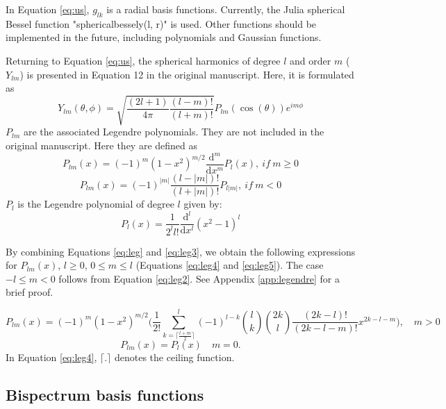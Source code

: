 \documentclass[12pt]{article}
\begin{document}
In Equation \ref{eq:us}, $g_{lk}$ is a radial basis functions. Currently, the Julia spherical Bessel function "sphericalbessely(l, r)" is used. Other functions should be implemented in the future, including polynomials and Gaussian functions.

Returning to Equation \ref{eq:us}, the spherical harmonics of degree $l$ and order $m$ ($Y_{lm}$) is presented in Equation 12 in the original manuscript. Here, it is formulated as
\begin{equation}
 Y_{lm}(\theta,\phi) = \sqrt{\frac{(2l + 1)}{4 \pi} \frac{(l-m)!}{(l+m)!}} P_{lm}(\cos(\theta)) e^{i m \phi}
\end{equation}
$P_{lm}$ are the associated Legendre polynomials. They are not included in the original manuscript. Here they are defined as
\begin{equation}
    \label{eq:leg}
    P_{lm}(x) = (-1)^m (1-x^2)^{m/2}  \frac{\mathrm{d}^m}{\mathrm{d}x^m} P_l(x), \ if \ m \ge 0
\end{equation}
\begin{equation}
    \label{eq:leg2}
    P_{lm} (x) = (-1)^{|m|} \frac{(l-|m|)!}{(l+|m|)!} P_{l|m|}, \ if \ m < 0
\end{equation}
$P_l$ is the Legendre polynomial of degree $l$ given by:
\begin{equation}
    \label{eq:leg3}
    P_l(x)=\frac{1}{2^l l!} \frac{\mathrm{d}^l}{\mathrm{d}x^l}(x^2-1)^l
\end{equation}

By combining Equations \ref{eq:leg} and \ref{eq:leg3}, we obtain the following expressions for $P_{lm}(x)$, $l \ge 0$, $0 \le m \le l$ (Equations \ref{eq:leg4} and \ref{eq:leg5}). The case $-l \le m <0$ follows from Equation \ref{eq:leg2}. See Appendix \ref{app:legendre} for a brief proof.

\begin{equation}
    \label{eq:leg4}
    P_{lm}(x) = (-1)^m (1-x^2)^{m/2} \Bigg( \frac{1}{2!} \sum_{k=\lceil \frac{l+m}{2} \rceil}^l  (-1)^{l-k} {l \choose k} {2k \choose l} \frac{(2k-l)!}{(2k-l-m)!} x^{2k-l-m} \Bigg), \quad m >0
\end{equation}
\begin{equation}
    \label{eq:leg5}
    P_{lm}(x) = P_l(x)  \quad m = 0.
\end{equation} 
In Equation \ref{eq:leg4}, $\lceil . \rceil$ denotes the ceiling function.

\subsection{Bispectrum basis functions}
\end{document}
